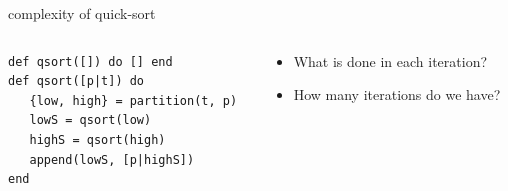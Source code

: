 \begin{frame}[fragile]{complexity of quick-sort}

\begin{columns}
   \begin{column}{.6\linewidth}
    \begin{verbatim}
def qsort([]) do [] end
def qsort([p|t]) do 
   {low, high} = partition(t, p)
   lowS = qsort(low)
   highS = qsort(high)
   append(lowS, [p|highS])
end
    \end{verbatim}
   \end{column}
   \begin{column}{.4\linewidth}
    \begin{itemize}
      \pause \item What is done in each iteration?
      \pause \item How many iterations do we have?       
    \end{itemize}
   \end{column}
\end{columns}


\end{frame}


